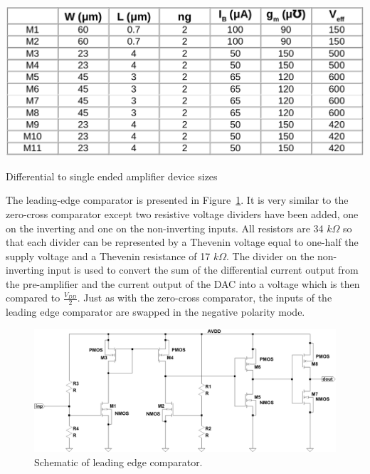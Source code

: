 \documentclass[12pt,oneside,final]{siuethesis}
\theoremstyle{definition}
\begin{document}
\begin{table}[htbp!]
 \centering
 \includegraphics[scale=.35,keepaspectratio=true]{./ch3_figures/d2s_sizes.png}
 \caption{Differential to single ended amplifier device sizes}
 \label{tab:d2s-sizes}
\end{table}

\par The leading-edge comparator is presented in Figure~\ref{FIG:LE_CMP}. It is very similar to the zero-cross comparator except two resistive voltage dividers have been added, one on the inverting and one on the non-inverting inputs.  All resistors are 34 $k \Omega$ so that each divider can be represented by a Thevenin voltage equal to one-half the supply voltage and a Thevenin resistance of 17 $k \Omega$.  The divider on the non-inverting input is used to convert the sum of the differential current output from the pre-amplifier and the current output of the DAC into a voltage which is then compared to $\frac{V_{DD}}{2}$. Just as with the zero-cross comparator, the inputs of the leading edge comparator are swapped in the negative polarity mode.

\begin{figure}[htbp!]
	\centering
 	\includegraphics[scale=0.55,keepaspectratio=true]{../Design_Reports/CFD_circuit_report/images/le_cmp.pdf}
 	\caption{Schematic of leading edge comparator.}
 	\label{FIG:LE_CMP}
\end{figure}
\end{document}
